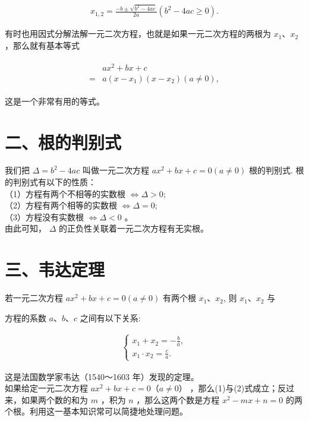 \documentclass[10pt]{article}
\begin{document}
\begin{align*}
x_{1,2}=\frac{-b \pm \sqrt{b^{2}-4 a c}}{2 a}\left(b^{2}-4 a c \geqslant 0\right) .
\end{align*}

有时也用因式分解法解一元二次方程，也就是如果一元二次方程的两根为 $x_{1} 、 x_{2}$ ，那么就有基本等式

\begin{align*}
\begin{aligned}
& a x^{2}+b x+c \\
= & a\left(x-x_{1}\right)\left(x-x_{2}\right)(a \neq 0),
\end{aligned}
\end{align*}

这是一个非常有用的等式。

\section*{二、根的判别式}
我们把 $\Delta=b^{2}-4 a c$ 叫做一元二次方程 $a x^{2}+b x+c=0(a \neq 0)$ 根的判别式. 根的判别式有以下的性质：\\
（1）方程有两个不相等的实数根 $\Longleftrightarrow \Delta>0$;\\
（2）方程有两个相等的实数根 $\Longleftrightarrow \Delta=0$;\\
（3）方程没有实数根 $\Longleftrightarrow \Delta<0$ 。\\
由此可知， $\Delta$ 的正负性关联着一元二次方程有无实根。

\section*{三、韦达定理}
若一元二次方程 $a x^{2}+b x+c=0(a \neq 0)$ 有两个根 $x_{1} 、 x_{2}$, 则 $x_{1} 、 x_{2}$ 与

方程的系数 $a 、 b 、 c$ 之间有以下关系:

\begin{align*}
\left\{\begin{array}{l}
x_{1}+x_{2}=-\frac{b}{a},  \tag{1}\\
x_{1} \cdot x_{2}=\frac{c}{a} .
\end{array}\right.
\end{align*}

这是法国数学家韦达（1540～1603 年）发现的定理。\\
如果给定一元二次方程 $a x^{2}+b x+c=0（a \neq 0）$ ，那么(1)与(2)式成立；反过来，如果两个数的和为 $m$ ，积为 $n$ ，那么这两个数是方程 $x^{2}-m x+n=0$ 的两个根。利用这一基本知识常可以简捷地处理问题。
\end{document}
